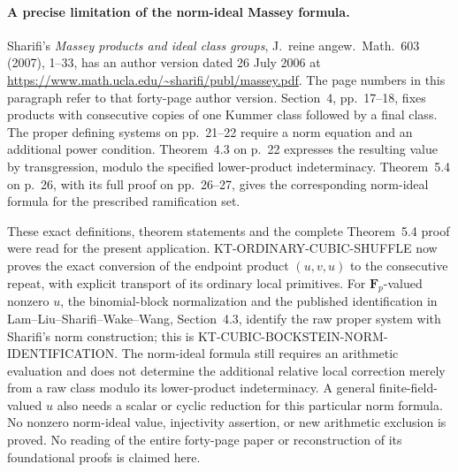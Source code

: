 \paragraph{A precise limitation of the norm-ideal Massey formula.}
Sharifi's \emph{Massey products and ideal class groups},
J.~reine angew.~Math.~603 (2007), 1--33, has an author
version dated 26 July 2006 at
\url{https://www.math.ucla.edu/~sharifi/publ/massey.pdf}.
The page numbers in this paragraph refer to that forty-page
author version.  Section~4, pp.~17--18, fixes products with
consecutive copies of one Kummer class followed by a final
class.  The proper defining systems on pp.~21--22 require
a norm equation and an additional power condition.
Theorem~4.3 on p.~22 expresses the resulting value by
transgression, modulo the specified lower-product
indeterminacy.  Theorem~5.4 on p.~26, with its full proof
on pp.~26--27, gives the corresponding norm-ideal formula
for the prescribed ramification set.

These exact definitions, theorem statements and the complete
Theorem~5.4 proof were read for the present application.
KT-ORDINARY-CUBIC-SHUFFLE now proves the exact conversion
of the endpoint product $(u,v,u)$ to the consecutive repeat,
with explicit transport of its ordinary local primitives.
For $\mathbf F_p$-valued nonzero $u$, the binomial-block
normalization and the published identification in
Lam--Liu--Sharifi--Wake--Wang, Section~4.3, identify the
raw proper system with Sharifi's norm construction; this
is KT-CUBIC-BOCKSTEIN-NORM-IDENTIFICATION.
The norm-ideal formula still requires an arithmetic
evaluation and does not determine the additional relative
local correction merely from a raw class modulo its
lower-product indeterminacy.  A general finite-field-valued
$u$ also needs a scalar or cyclic reduction for this
particular norm formula.  No nonzero norm-ideal value,
injectivity assertion, or new arithmetic exclusion is
proved.  No reading of the entire forty-page paper or
reconstruction of its foundational proofs is claimed here.
